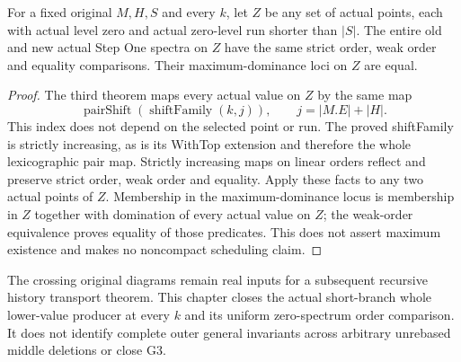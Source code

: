 \begin{theorem}
\label{hir:original-interior-full-family-short-zero-spectrum-order}
\leanok
{}
For a fixed original $M,H,S$ and every $k$, let $Z$ be any set of actual
points, each with actual level zero and actual zero-level run shorter
than $|S|$.  The entire old and new actual Step One spectra on $Z$ have
the same strict order, weak order and equality comparisons.  Their
maximum-dominance loci on $Z$ are equal.
\end{theorem}
\begin{proof}
The third theorem maps every actual value on $Z$ by the same map
\[
 \operatorname{pairShift}(\operatorname{shiftFamily}(k,j)),
 \qquad j=|M.E|+|H|.
\]
This index does not depend on the selected point or run.  The proved shiftFamily is
strictly increasing, as is its WithTop extension and therefore the whole
lexicographic pair map.  Strictly increasing maps on linear orders reflect
and preserve strict order, weak order and equality.  Apply these facts to
any two actual points of $Z$.  Membership in the maximum-dominance locus
is membership in $Z$ together with domination of every actual value on
$Z$; the weak-order equivalence proves equality of those predicates.
This does not assert maximum existence and makes no noncompact scheduling claim.
\end{proof}

The crossing original diagrams remain real inputs for a subsequent
recursive history transport theorem.  This chapter closes the actual
short-branch whole lower-value producer at every $k$ and its uniform
zero-spectrum order comparison.  It does not identify complete outer
general invariants across arbitrary unrebased middle deletions or close G3.
